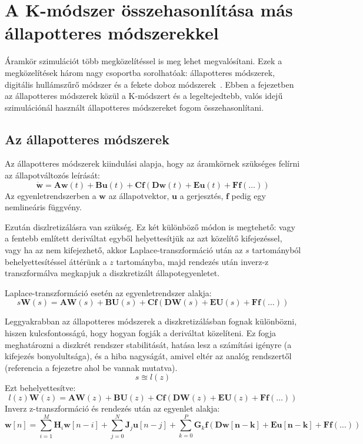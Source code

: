 \chapter{A K-módszer összehasonlítása más állapotteres módszerekkel}

Áramkör szimulációt több megközelítéssel is meg lehet megvalósítani. Ezek a megközelítések három nagy csoportba sorolhatóak: állapotteres módszerek, digitális hullámszűrő módszer és a fekete doboz módszerek~\cite{book}. Ebben a fejezetben az állapotteres módszerek közül a K-módszert és a legeltejedtebb, valós idejű szimulációnál használt állapotteres módszereket fogom összehasonlítani.

\section{Az állapotteres módszerek}

Az állapotteres módszerek kiindulási alapja, hogy az áramkörnek szükséges felírni az állapotváltozós leírását:
\begin{equation}
    \mathbf{\dot{w}}=\mathbf{Aw}(t)+\mathbf{Bu}(t)+\mathbf{Cf}(\mathbf{Dw}(t)+\mathbf{Eu}(t)+\mathbf{Ff}(\ldots))
    \label{avlnaTDK}
\end{equation}
Az egyenletrendszerben a $\mathbf{w}$ az állapotvektor, $\mathbf{u}$ a gerjesztés, $\mathbf{f}$ pedig egy nemlineáris függvény.

Ezután diszlretizálásra van szükség. Ez két különböző módon is megtehető: vagy a fentebb említett deriváltat egyből helyettesítjük az azt közelítő kifejezéssel, vagy ha az nem kifejezhető, akkor Laplace-transzformáció után az $s$ tartományból behelyettesítéssel áttérünk a $z$ tartományba, majd rendezés után inverz-z transzformálva megkapjuk a diszkretizált állapotegyenletet.

Laplace-transzformáció esetén az egyenletrendszer alakja:
\begin{equation}
    s\mathbf{W}(s)=\mathbf{AW}(s)+\mathbf{BU}(s)+\mathbf{Cf}(\mathbf{DW}(s)+\mathbf{EU}(s)+\mathbf{Ff}(\ldots))
\end{equation}

Leggyakrabban az állapotteres módszerek a diszkretizálásban fognak különbözni, hiszen kulcsfontosságú, hogy hogyan fogják a deriváltat közelíteni. Ez fogja meghatározni a diszkrét rendszer stabilitását, hatása lesz a számítási igényre (a kifejezés bonyolultsága), és a hiba nagyságát, amivel eltér az analóg rendszertől (referencia a fejezetre ahol be vannak mutatva).
\begin{equation}
    s \approxeq l(z)
\end{equation}
Ezt behelyettesítve:
\begin{equation}
    l(z)\mathbf{W}(z)=\mathbf{AW}(z)+\mathbf{BU}(z)+\mathbf{Cf}(\mathbf{DW}(z)+\mathbf{EU}(z)+\mathbf{Ff}(\ldots))
\end{equation}
Inverz z-transzformáció és rendezés után az egyenlet alakja:
\begin{equation}
    \mathbf{w}[n]=\sum_{i = 1}^{M}  \mathbf{H}_i \mathbf{w}[n-i]+\sum_{j=0}^{N}\mathbf{J}_j \mathbf{u}[n-j]+\sum_{k=0}^{P}\mathbf{G}_k \mathbf{f(\mathbf{Dw}[n-k] +\mathbf{Eu}[n-k]+\mathbf{Ff}(\ldots))}
\end{equation}

